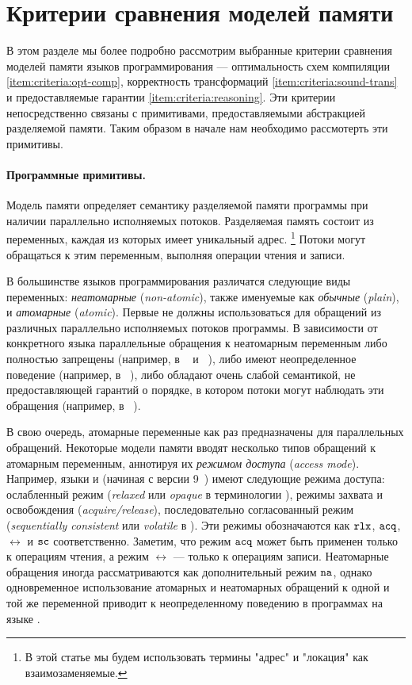 \section{Критерии сравнения моделей памяти}
\label{sec:background}

В этом разделе мы более подробно рассмотрим 
выбранные критерии сравнения моделей памяти языков программирования ---
 оптимальность схем компиляции \ref{item:criteria:opt-comp},
корректность трансформаций \ref{item:criteria:sound-trans}
и предоставляемые гарантии \ref{item:criteria:reasoning}.
Эти критерии непосредственно связаны с примитивами, 
предоставляемыми абстракцией разделяемой памяти. 
Таким образом в начале нам необходимо рассмотерть эти примитивы. 

\paragraph{Программные примитивы.}
\label{sec:background:primitives}

Модель памяти определяет семантику разделяемой памяти программы
при наличии  параллельно исполняемых потоков. 
Разделяемая память состоит из переменных, 
каждая из которых имеет уникальный адрес.%
\footnote{В этой статье мы будем использовать 
термины "адрес" и "локация" как взаимозаменяемые.}
Потоки могут обращаться к этим переменным, 
выполняя операции чтения и записи. 


В большинстве языков программирования различатся следующие виды переменных:
\emph{неатомарные} (\emph{non-atomic}),
также именуемые как \emph{обычные} (\emph{plain}),
и \emph{атомарные} (\emph{atomic}).
Первые не должны использоваться для  
обращений из различных параллельно исполняемых потоков программы. 
В зависимости от конкретного языка 
параллельные обращения к неатомарным переменным 
либо полностью запрещены 
(например, в  \Haskell~\cite{Marlow-al:Haskell10, Vollmer-al:PPoPP17} и \Rust~\cite{RustBook:19}), 
либо имеют неопределенное поведение (например, в  \CPP~\cite{Boehm-Adve:PLDI08, Batty-al:POPL11}), 
либо обладают очень слабой семантикой,
не предоставляющей гарантий о порядке,
в котором  потоки могут наблюдать эти обращения
(например, в \Java~\cite{Manson-al:POPL05}). 

В свою очередь, атомарные переменные как раз 
предназначены для параллельных обращений. 
Некоторые модели памяти вводят 
несколько типов обращений к атомарным переменным, аннотируя их 
 \emph{режимом доступа} (\emph{access mode}).
Например, языки \CPP и \Java (начиная с версии 9~\cite{Bender-Palsberg:OOPSLA19})
имеют следующие режима доступа: ослабленный режим
(\emph{relaxed} или \emph{opaque} в терминологии \Java),
режимы захвата и освобождения (\emph{acquire/release}), 
последовательно согласованный режим (\emph{sequentially consistent}
или  \emph{volatile} в \Java). 
Эти режимы обозначаются как $\mathtt{rlx}$, ${\mathtt{acq}}$, $\rel$ и ${\mathtt{sc}}$ соответственно.
Заметим, что режим ${\mathtt{acq}}$ может быть применен только к операциям чтения,
а режим $\rel$ --- только к операциям записи.
Неатомарные обращения иногда рассматриваются как дополнительный режим $\mathtt{na}$, 
однако  одновременное использование атомарных 
и неатомарных обращений к одной и той же переменной 
приводит к неопределенному поведению в программах на языке \CPP.

